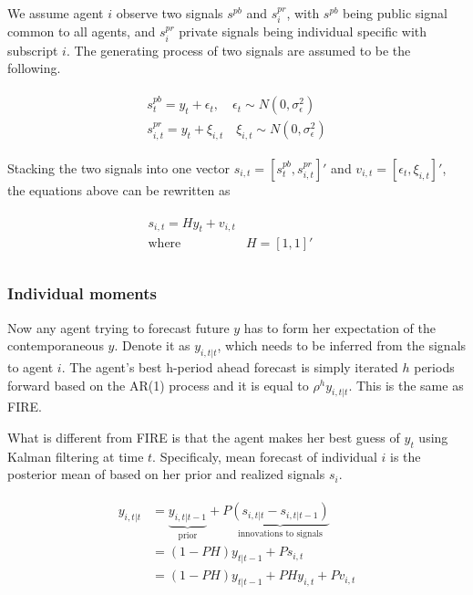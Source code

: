 \documentclass[]{article}
\begin{document}
We assume agent $i$ observe two signals $s^{pb}$ and $s^{pr}_i$, with $s^{pb}$ being public signal common to all agents, and $s^{pr}_i$ private signals being individual specific with subscript $i$. The generating process of two signals are assumed to be the following.

\begin{eqnarray}
\begin{aligned}
s^{pb}_t = y_t + \epsilon_t, \quad \epsilon_t \sim N(0,\sigma^2_\epsilon)\\ 
s^{pr}_{i,t} = y_t + \xi_{i,t} \quad \xi_{i,t} \sim N(0,\sigma^2_\epsilon)
\end{aligned}
\end{eqnarray}

Stacking the two signals into one vector $s_{i,t} = [s^{pb}_t,s^{pr}_{i,t}]'$ and $v_{i,t}= [\epsilon_t,\xi_{i,t}]'$, the equations above can be rewritten as 

\begin{eqnarray}
\begin{aligned}
s_{i,t} = H y_{t} + v_{i,t} \\
\text{where } & H=[1,1]' \quad \\
\end{aligned}
\end{eqnarray}


\subsubsection{Individual moments }

Now any agent trying to forecast future $y$ has to form her expectation of the contemporaneous $y$. Denote it as  $y_{i,t|t}$, which needs to be inferred from the signals to agent $i$. The agent's best h-period ahead forecast is simply iterated $h$ periods forward based on the AR(1) process and it is equal to $\rho^h y_{i,t|t}$. This is the same as FIRE.

What is different from FIRE is that the agent makes her best guess of $y_t$ using Kalman filtering at time $t$. Specificaly, mean forecast of individual $i$ is the posterior mean of based on her prior and realized signals $s_i$. 


\begin{eqnarray}
\begin{aligned}
y_{i,t|t}  
& =  \underbrace{y_{i,t|t-1}}_{\text{prior}} + P \underbrace {(s_{i,t|t}-s_{i,t|t-1})}_{\text{innovations to signals}} \\
& = (1-PH) y_{t|t-1} + Ps_{i,t} \\
& = (1-PH) y_{t|t-1} + PH y_{i,t} + P v_{i,t} 
\end{aligned}
\end{eqnarray}
\end{document}
